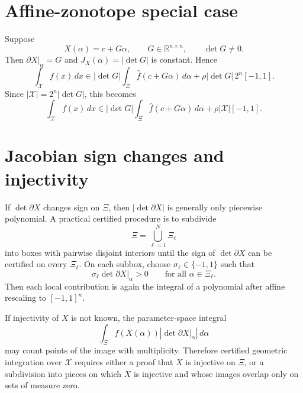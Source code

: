 \documentclass[11pt]{article}
\newcommand{\R}{\mathbb{R}}
\newcommand{\abs}[1]{\left\lvert #1\right\rvert}
\begin{document}
\section{Affine-zonotope special case}

Suppose
\begin{equation}
    X(\alpha)=c+G\alpha,
    \qquad
    G\in\R^{n\times n},
    \qquad
    \det G\neq 0.
    \label{eq:affine-zonotope-map}
\end{equation}
Then \(\left.\partial X\right|_\alpha=G\) and \(J_X(\alpha)=\abs{\det G}\) is constant. Hence
\begin{equation}
    \int_{\mathcal{X}} f(x)\,dx
    \in
    \abs{\det G}\int_\Xi \widehat f(c+G\alpha)\,d\alpha
    +
    \rho\abs{\det G}\,2^n[-1,1].
    \label{eq:affine-zonotope-integral}
\end{equation}
Since \(\abs{\mathcal{X}}=2^n\abs{\det G}\), this becomes
\begin{equation}
    \boxed{
    \int_{\mathcal{X}} f(x)\,dx
    \in
    \abs{\det G}\int_\Xi \widehat f(c+G\alpha)\,d\alpha
    +
    \rho\abs{\mathcal{X}}[-1,1].
    }
    \label{eq:affine-zonotope-boxed}
\end{equation}

\section{Jacobian sign changes and injectivity}

If \(\det\partial X\) changes sign on \(\Xi\), then \(\abs{\det\partial X}\) is generally only piecewise polynomial. A practical certified procedure is to subdivide
\[
    \Xi=\bigcup_{\ell=1}^N \Xi_\ell
\]
into boxes with pairwise disjoint interiors until the sign of \(\det\partial X\) can be certified on every \(\Xi_\ell\). On each subbox, choose \(\sigma_\ell\in\{-1,1\}\) such that
\[
    \sigma_\ell\det\left.\partial X\right|_\alpha>0
    \qquad
    \text{for all }\alpha\in\Xi_\ell.
\]
Then each local contribution is again the integral of a polynomial after affine rescaling to \([-1,1]^n\).

If injectivity of \(X\) is not known, the parameter-space integral
\[
    \int_\Xi f(X(\alpha))\abs{\det\left.\partial X\right|_\alpha}\,d\alpha
\]
may count points of the image with multiplicity. Therefore certified geometric integration over \(\mathcal{X}\) requires either a proof that \(X\) is injective on \(\Xi\), or a subdivision into pieces on which \(X\) is injective and whose images overlap only on sets of measure zero.
\end{document}
